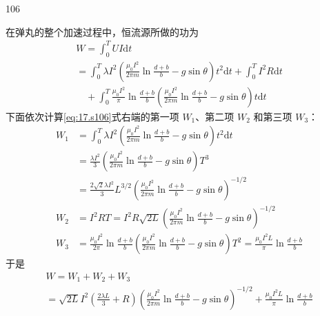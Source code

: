 \begin{solution}{106}
\begin{subsolution}
在弹丸的整个加速过程中，恒流源所做的功为
\begin{equation}
\begin{array}{l}
W = \int_{0}^{T} U I \mathrm{d}t \\
= \int_{0}^{T} \lambda I^{2} \left(\frac{\mu_{0} I^{2}}{2\pi m}\ln\frac{d+b}{b} - g\sin\theta\right) t^{2} \mathrm{d}t + \int_{0}^{T} I^{2} R \mathrm{d}t \\
\quad + \int_{0}^{T} \frac{\mu_{0} I^{2}}{\pi}\ln\frac{d+b}{b} \left(\frac{\mu_{0} I^{2}}{2\pi m}\ln\frac{d+b}{b} - g\sin\theta\right) t \mathrm{d}t
\end{array}
\label{eq:17.s106}
\end{equation}
下面依次计算\eqref{eq:17.s106}式右端的第一项 $W_{1}$、第二项 $W_{2}$ 和第三项 $W_{3}$：
\begin{align*}
W_{1} &= \int_{0}^{T} \lambda I^{2} \left(\frac{\mu_{0} I^{2}}{2\pi m}\ln\frac{d+b}{b} - g\sin\theta\right) t^{2} \mathrm{d}t \\
&= \frac{\lambda I^{2}}{3} \left(\frac{\mu_{0} I^{2}}{2\pi m}\ln\frac{d+b}{b} - g\sin\theta\right) T^{3} \\
&= \frac{2\sqrt{2}\lambda I^{2}}{3} L^{3/2} \left(\frac{\mu_{0} I^{2}}{2\pi m}\ln\frac{d+b}{b} - g\sin\theta\right)^{-1/2} \\
W_{2} &= I^{2} R T = I^{2} R \sqrt{2L} \left(\frac{\mu_{0} I^{2}}{2\pi m}\ln\frac{d+b}{b} - g\sin\theta\right)^{-1/2} \\
W_{3} &= \frac{\mu_{0} I^{2}}{2\pi}\ln\frac{d+b}{b} \left(\frac{\mu_{0} I^{2}}{2\pi m}\ln\frac{d+b}{b} - g\sin\theta\right) T^{2}
= \frac{\mu_{0} I^{2} L}{\pi}\ln\frac{d+b}{b}
\end{align*}
于是
\begin{equation}
\begin{array}{l}
W = W_{1} + W_{2} + W_{3} \\
= \sqrt{2L} I^{2} \left(\frac{2\lambda L}{3} + R\right) \left(\frac{\mu_{0} I^{2}}{2\pi m}\ln\frac{d+b}{b} - g\sin\theta\right)^{-1/2} + \frac{\mu_{0} I^{2} L}{\pi}\ln\frac{d+b}{b}
\end{array}
\label{eq:18.s106}
\end{equation}
\end{subsolution}


\end{solution}
